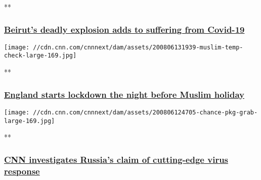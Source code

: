 **

\hypertarget{beiruts-deadly-explosion-adds-to-suffering-from-covid-19-1}{%
\subsubsection{\texorpdfstring{\href{/videos/world/2020/08/07/beirut-explosion-amplifies-coronavirus-economic-struggles-go-there.cnn/video/playlists/coronavirus-intl/}{Beirut's
deadly explosion adds to suffering from
Covid-19}}{Beirut's deadly explosion adds to suffering from Covid-19}}\label{beiruts-deadly-explosion-adds-to-suffering-from-covid-19-1}}

\href{/videos/world/2020/08/06/england-lockdown-on-eid-eve-muslims-veselinovic-vpx.cnn/video/playlists/coronavirus-intl/}{}

\texttt{[image: //cdn.cnn.com/cnnnext/dam/assets/200806131939-muslim-temp-check-large-169.jpg]}

**

\hypertarget{england-starts-lockdown-the-night-before-muslim-holiday}{%
\subsubsection{\texorpdfstring{\href{/videos/world/2020/08/06/england-lockdown-on-eid-eve-muslims-veselinovic-vpx.cnn/video/playlists/coronavirus-intl/}{England
starts lockdown the night before Muslim
holiday}}{England starts lockdown the night before Muslim holiday}}\label{england-starts-lockdown-the-night-before-muslim-holiday}}

\href{/videos/world/2020/08/06/russia-vaccine-testing-matthew-chance-pkg-newday-intl-ldn-vpx.cnn/video/playlists/coronavirus-intl/}{}

\texttt{[image: //cdn.cnn.com/cnnnext/dam/assets/200806124705-chance-pkg-grab-large-169.jpg]}

**

\hypertarget{cnn-investigates-russias-claim-of-cutting-edge-virus-response}{%
\subsubsection{\texorpdfstring{\href{/videos/world/2020/08/06/russia-vaccine-testing-matthew-chance-pkg-newday-intl-ldn-vpx.cnn/video/playlists/coronavirus-intl/}{CNN
investigates Russia's claim of cutting-edge virus
response}}{CNN investigates Russia's claim of cutting-edge virus response}}\label{cnn-investigates-russias-claim-of-cutting-edge-virus-response}}

